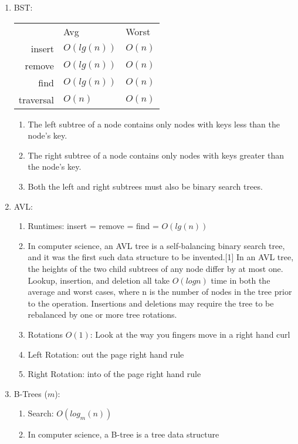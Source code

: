 \documentclass[12pt]{article}
\renewcommand{\=}[1]{\stackrel{#1}{=}} %
\theoremstyle{definition}
\theoremstyle{remark}
\begin{document}
\begin{enumerate}
\begin{enumerate}
\begin{enumerate}
      \item BST:
        \begin{tabular}{r l l}
          & Avg & Worst\\
          insert & $O(lg(n))$ & $O(n)$ \\
          remove & $O(lg(n))$ & $O(n)$ \\
          find & $O(lg(n))$ & $O(n)$ \\
          traversal & $O(n)$ & $O(n)$\\
        \end{tabular}

        \begin{enumerate}
        \item The left subtree of a node contains only nodes with keys less than the node's key.
        \item The right subtree of a node contains only nodes with keys greater than the node's key.
        \item Both the left and right subtrees must also be binary search trees.
        \end{enumerate}
      \item AVL:
        \begin{enumerate}
        \item Runtimes: insert = remove = find = $O(lg(n))$
        \item In computer science, an AVL tree is a self-balancing binary search tree, and it was the first such data structure to be invented.[1] In an AVL tree, the heights of the two child subtrees of any node differ by at most one. Lookup, insertion, and deletion all take $O(log n)$ time in both the average and worst cases, where n is the number of nodes in the tree prior to the operation. Insertions and deletions may require the tree to be rebalanced by one or more tree rotations.
        \item Rotations $O(1)$: Look at the way you fingers move in a
          right hand curl
        \item Left Rotation: out the page right hand rule
        \item Right Rotation: into of the page right hand rule
        \end{enumerate}
      \item B-Trees ($m$):
        \begin{enumerate}
        \item Search: $O( log_m(n))$
        \item In computer science, a B-tree is a tree data structure

\end{enumerate}
\end{enumerate}
\end{enumerate}
\end{enumerate}
\end{document}
